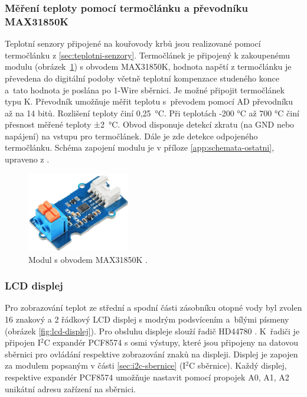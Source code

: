 \subsubsection{Měření teploty pomocí termočlánku a převodníku MAX31850K}
Teplotní senzory připojené na kouřovody krbů jsou realizované pomocí termočlánku z \ref{sec:teplotni-senzory}. Termočlánek je připojený k zakoupenému modulu (obrázek~\ref{fig:modul-max31850k-1-wire-prevodnik-termoclanku}) s obvodem MAX31850K, hodnota napětí z termočlánku je převedena do digitální podoby včetně teplotní kompenzace studeného konce a~tato hodnota je poslána po 1-Wire sběrnici. Je možné připojit termočlánek typu K. Převodník umožňuje měřit teplotu s~převodem pomocí AD převodníku až na 14 bitů. Rozlišení teploty činí 0,25~°C. Při teplotách -200 °C až 700 °C činí přesnost měřené teploty ±2~°C. Obvod disponuje detekcí zkratu (na GND nebo napájení) na vstupu pro termočlánek. Dále je zde detekce odpojeného termočlánku. Schéma zapojení modulu je v příloze \ref{app:schemata-ostatni}, upraveno z \cite{prevodnik-max31850k}.


\begin{figure}[H]
    \centering
    \includegraphics[width=0.4\textwidth]{images/krb/modul-max31850k-1-wire-prevodnik-termoclanku.png}
    \caption[Modul s obvodem MAX31850K.]{Modul s obvodem MAX31850K \cite{prevodnik-max31850k}.}
    \label{fig:modul-max31850k-1-wire-prevodnik-termoclanku}
\end{figure}

\subsubsection{LCD displej}
Pro zobrazování teplot ze střední a spodní části zásobníku otopné vody byl zvolen 16 znakový a 2 řádkový LCD displej s modrým podsvícením a~bílými písmeny (obrázek \ref{fig:lcd-displej}). Pro obsluhu displeje slouží řadič HD44780 \cite{hd44780u}. K~řadiči je připojen I$^2$C expandér PCF8574 \cite{pcf8574} s osmi výstupy, které jsou připojeny na datovou sběrnici pro ovládání respektive zobrazování znaků na displeji. Displej je zapojen za modulem popsaným v části \ref{sec:i2c-sbernice} (I$^2$C sběrnice). Každý displej, respektive expandér PCF8574  umožňuje nastavit pomocí propojek A0, A1, A2 unikátní adresu zařízení na sběrnici.

